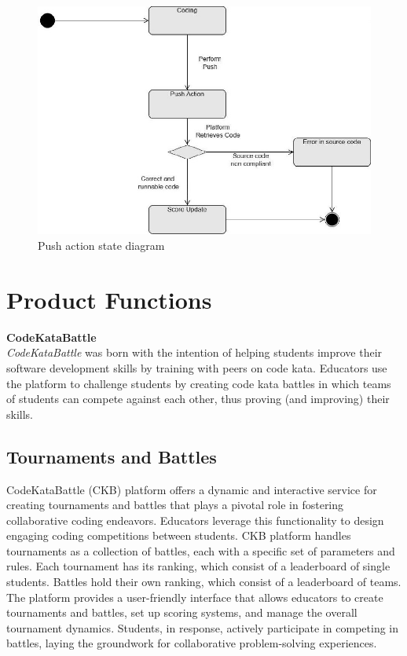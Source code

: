 \begin{figure}[H]
    \begin{center}
        \includegraphics[width=0.9\linewidth]{Images/push-action.jpg}
        \caption{Push action state diagram}
        \label{fig:state_diagram_3}%
    \end{center}
\end{figure}


\section{Product Functions}
\label{sec:product_functions}%
\textbf{CodeKataBattle}\\
\noindent\textit{CodeKataBattle} was born with the intention of helping students improve their software development skills by training with peers on code kata.
Educators use the platform to challenge students by creating code kata battles in which teams of students can compete against each other, thus proving (and improving) their skills.\\
\subsection*{Tournaments and Battles}
CodeKataBattle (CKB) platform offers a dynamic and interactive service for creating tournaments and battles that plays a pivotal role in fostering collaborative coding endeavors. 
Educators leverage this functionality to design engaging coding competitions between students.
CKB platform handles tournaments as a collection of battles, each with a specific set of parameters and rules. Each tournament has its ranking, which consist of a leaderboard of single students.
Battles hold their own ranking, which consist of a leaderboard of teams. 
The platform provides a user-friendly interface that allows educators to create tournaments and battles, set up scoring systems, and manage the overall tournament dynamics.
Students, in response, actively participate in competing in battles, laying the groundwork for collaborative problem-solving experiences.

